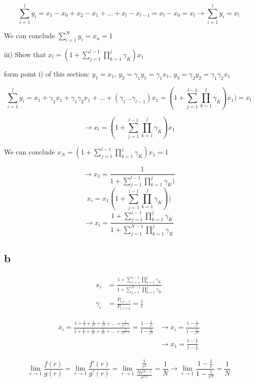\[ \sum\limits_{i=1}^{l} y_i = x_1-x_0+x_2-x_1+\dots+x_l-x_{l-1} = x_l -x_0 = x_l \rightarrow \boxed{\sum\limits_{i=1}^{l} y_i = x_l}  \]

We can conclude $\boxed{\sum\limits_{i=1}^{N} y_i = x_n = 1}$

iii) Show that $x_l = (1+ \sum\limits_{j=1}^{l-1} \prod\limits_{k=1}^{j} \gamma_K)x_1$

form point i) of this section: $y_1 = x_1$, $y_2 = \gamma_1y_1 = \gamma_1x_1$, $y_3=\gamma_2y_2 = \gamma_1\gamma_2x_1$

\[ \sum\limits_{i=1}^{l} y_i = x_1 + \gamma_1x_1 + \gamma_1\gamma_2x_1+\dots+(\gamma_1\dots\gamma_{l-1})x_1 = (1+\sum\limits_{j=1}^{l-1}\prod\limits_{k=1}^{j} \gamma_K) x_1 ) = x_l \]

\[ \rightarrow \boxed{x_l = (1+ \sum\limits_{j=1}^{l-1}\prod\limits_{k=1}^{j} \gamma_K)x_1  }  \]

We can conclude $x_N = (1+ \sum\limits_{j=1}^{l-1}\prod\limits_{k=1}^{j} \gamma_K)x_1 = 1$

\[ \rightarrow  \boxed{ x_1 = \frac{1}{ 1 + \sum\limits_{j=1}^{l-1}\prod\limits_{k=1}^{j} \gamma_K)} } \]
\[ x_i = x_1 (1+\sum\limits_{j=1}^{i-1}\prod\limits_{k=1}^{j} \gamma_K) ) \]
\[ \rightarrow  \boxed{ x_i = \frac{1+\sum\limits_{j=1}^{i-1}\prod\limits_{k=1}^{j} \gamma_K}{1+\sum\limits_{j=1}^{N-1}\prod\limits_{k=1}^{j} \gamma_K} }\]

\subsection{b}

\begin{align*}
x_i &= \frac{1+\sum\limits_{j=1}^{i-1}\prod\limits_{k=1}^{j} \gamma_K}{1+\sum\limits_{j=1}^{N-1}\prod\limits_{k=1}^{j} \gamma_K}\\
\gamma_i &= \frac{P_{i, i-1}}{P_{i,i+1}} = \frac{1}{r}
\end{align*}

\begin{align*} x_i = \frac{1+\frac{1}{r} + \frac{1}{r^2} +\frac{1}{r^3} + \dots + \frac{1}{r^{i-1}}}{1+\frac{1}{r} + \frac{1}{r^2} +\frac{1}{r^3} + \dots + \frac{1}{r^{N-1}}} = \frac{1-\frac{1}{r^i}}{1-\frac{1}{r^N}} &\rightarrow \boxed{ x_i = \frac{1-\frac{1}{r^i}}{1-\frac{1}{r^N}} }\\
&\rightarrow \boxed{ x_1 = \frac{1-\frac{1}{r}}{1-\frac{1}{r}} }
\end{align*}

\[ \lim\limits_{r\rightarrow1}  \frac{f(r)}{g(r)} = \lim\limits_{r\rightarrow1}  \frac{f'(r)}{g'(r)} =  \lim\limits_{r\rightarrow1}  \frac{\frac{1}{r^2}}{\frac{Nr^{N-1}}{r^{2N}}} = \frac{1}{N} \rightarrow \boxed{\lim\limits_{r\rightarrow1} \frac{1-\frac{1}{r}}{1-\frac{1}{r^N}} = \frac{1}{N} }   \]